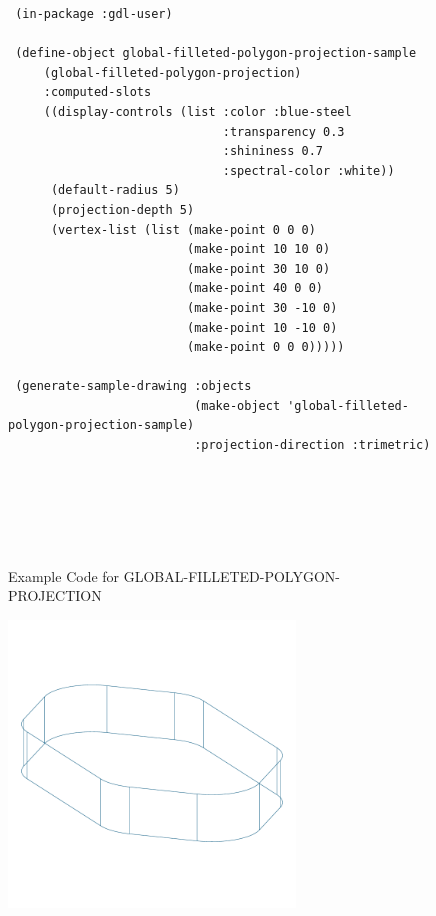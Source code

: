 \documentclass [11pt]{book}
\begin{document}
\begin{itemize}
\begin{figure}
\begin{lrbox}{\boxedverb}
\begin{minipage}{\linewidth}
{\begin{verbatim}
 (in-package :gdl-user)

 (define-object global-filleted-polygon-projection-sample 
     (global-filleted-polygon-projection)
     :computed-slots
     ((display-controls (list :color :blue-steel 
                              :transparency 0.3 
                              :shininess 0.7 
                              :spectral-color :white))
      (default-radius 5)
      (projection-depth 5)
      (vertex-list (list (make-point 0 0 0)
                         (make-point 10 10 0)
                         (make-point 30 10 0)
                         (make-point 40 0 0)
                         (make-point 30 -10 0)
                         (make-point 10 -10 0)
                         (make-point 0 0 0)))))

 (generate-sample-drawing :objects 
                          (make-object 'global-filleted-polygon-projection-sample)
                          :projection-direction :trimetric)






\end{verbatim}}
\end{minipage}
\end{lrbox}
\fbox{\usebox{\boxedverb}}

\caption{Example Code for GLOBAL-FILLETED-POLYGON-PROJECTION}

\label{fig:example-code-GLOBAL-FILLETED-POLYGON-PROJECTION}

\end{figure}

\begin{figure}
\begin{center}
\includegraphics[width=3in,height=3in]{../images/example-global-filleted-polygon-projection.pdf}
\end{center}


\end{figure}
\end{itemize}
\end{document}
